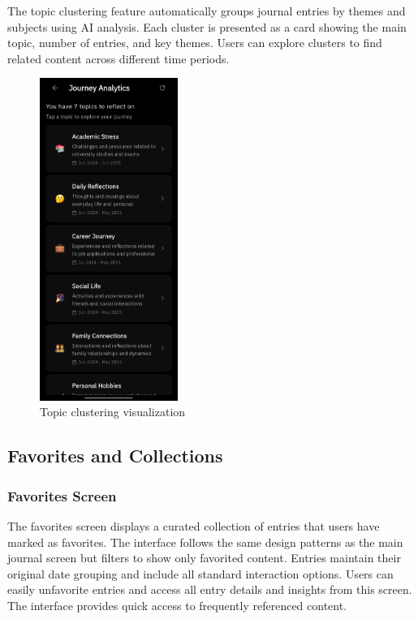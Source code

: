 The topic clustering feature automatically groups journal entries by themes and subjects using AI analysis. Each cluster is presented as a card showing the main topic, number of entries, and key themes. Users can explore clusters to find related content across different time periods.

\begin{figure}[H]
\centering
\includegraphics[width=0.4\textwidth]{files/imgs/prototype/topic_clustering.jpeg}
\caption{Topic clustering visualization}
\label{fig:topic-clustering}
\end{figure}

\subsection{Favorites and Collections}

\subsubsection{Favorites Screen}

The favorites screen displays a curated collection of entries that users have marked as favorites. The interface follows the same design patterns as the main journal screen but filters to show only favorited content. Entries maintain their original date grouping and include all standard interaction options. Users can easily unfavorite entries and access all entry details and insights from this screen. The interface provides quick access to frequently referenced content.

